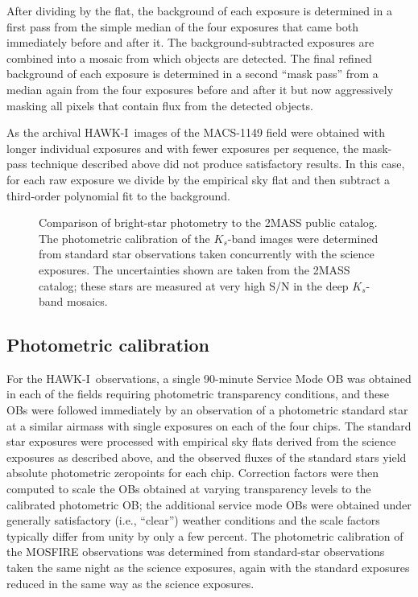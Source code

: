 \documentclass[preprint2]{aastex6}
\gdef\HAWKI{\mbox{HAWK-I}}
\begin{document}
After dividing by the flat, the background of each exposure is determined in a first pass from the simple median of the four exposures that came both immediately before and after it.  The background-subtracted exposures are combined into a mosaic from which objects are detected.  The final refined background of each exposure is determined in a second ``mask pass'' from a median again from the four exposures before and after it but now aggressively masking all pixels that contain flux from the detected objects.

As the archival \HAWKI\ images of the MACS-1149 field were obtained with longer individual exposures and with fewer exposures per sequence, the mask-pass technique described above did not produce satisfactory results.  In this case, for each raw exposure we divide by the empirical sky flat and then subtract a third-order polynomial fit to the background.  

\begin{figure}[!t]
\caption{Comparison of bright-star photometry to the 2MASS public catalog.  The photometric calibration of the $K_s$-band images were determined from standard star observations taken concurrently with the science exposures.  The uncertainties shown are taken from the 2MASS catalog; these stars are measured at very high S/N in the deep $K_s$-band mosaics.  \label{fig:2mass}}  
\end{figure}

\subsection{Photometric calibration}
\label{s:calib}

For the \HAWKI\ observations, a single 90-minute Service Mode OB was obtained in each of the fields requiring photometric transparency conditions, and these OBs were followed immediately by an observation of a photometric standard star at a similar airmass with single exposures on each of the four chips.  The standard star exposures were processed with empirical sky flats derived from the science exposures as described above, and the observed fluxes of the standard stars yield absolute photometric zeropoints for each chip.  Correction factors were then computed to scale the OBs obtained at varying transparency levels to the calibrated photometric OB; the additional service mode OBs were obtained under generally satisfactory (i.e., ``clear'') weather conditions and the scale factors typically differ from unity by only a few percent.  The photometric calibration of the MOSFIRE observations was determined from standard-star observations taken the same night as the science exposures, again with the standard exposures reduced in the same way as the science exposures.
\end{document}
